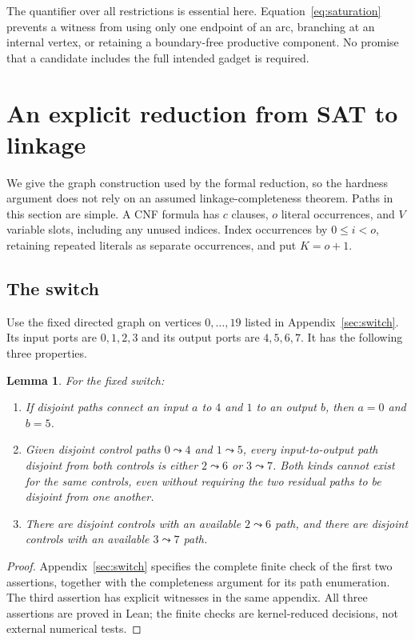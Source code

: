 \documentclass[11pt,a4paper]{article}
\newtheorem{lemma}[theorem]{Lemma}
\begin{document}
The quantifier over all restrictions is essential here. Equation~\eqref{eq:saturation}
prevents a witness from using only one endpoint of an arc, branching at an
internal vertex, or retaining a boundary-free productive component. No
promise that a candidate includes the full intended gadget is required.

\section{An explicit reduction from SAT to linkage}
We give the graph construction used by the formal reduction, so the
hardness argument does not rely on an assumed linkage-completeness theorem.
Paths in this section are simple. A CNF formula has $c$ clauses, $o$ literal
occurrences, and $V$ variable slots, including any unused indices. Index
occurrences by $0\leq i<o$, retaining repeated literals as separate
occurrences, and put $K=o+1$.

\subsection{The switch}
Use the fixed directed graph on vertices $0,\ldots,19$ listed in
Appendix~\ref{sec:switch}. Its input ports are $0,1,2,3$ and its output
ports are $4,5,6,7$. It has the following three properties.

\begin{lemma}\label{lem:switch}
For the fixed switch:
\begin{enumerate}
\item If disjoint paths connect an input $a$ to $4$ and $1$ to an output
$b$, then $a=0$ and $b=5$.
\item Given disjoint control paths $0\leadsto4$ and $1\leadsto5$, every
input-to-output path disjoint from both controls is either
$2\leadsto6$ or $3\leadsto7$. Both kinds cannot exist for the same controls,
even without requiring the two residual paths to be disjoint from one another.
\item There are disjoint controls with an available $2\leadsto6$ path,
and there are disjoint controls with an available $3\leadsto7$ path.
\end{enumerate}
\end{lemma}
\begin{proof}
Appendix~\ref{sec:switch} specifies the complete finite check of the first
two assertions, together with the completeness argument for its path
enumeration. The third assertion has explicit witnesses in the same
appendix. All three assertions are proved in Lean; the finite checks are
kernel-reduced decisions, not external numerical tests.
\end{proof}
\end{document}
